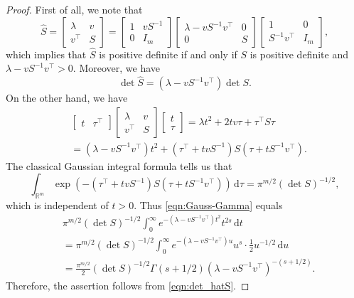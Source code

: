\documentclass[12pt]{amsart}
\theoremstyle{plain}
\theoremstyle{definition}
\theoremstyle{remark}
\newcommand{\R}{\mathbb{R}}
\newcommand{\1}{\mathbf{1}}
\newcommand{\dd}{\mathrm{d}}
\begin{document}
\begin{proof}
First of all,
we note that
\[
\hat{S}
 = \begin{bmatrix} \lambda & v \\ v^\top & S \end{bmatrix}
= \begin{bmatrix} 1 & v S^{-1} \\ 0 & I_m \end{bmatrix} 
\begin{bmatrix} \lambda - v S^{-1} v^\top & 0 \\ 0 & S \end{bmatrix}
\begin{bmatrix} 1 & 0\\ S^{-1} v^\top & I_m \end{bmatrix}, 
\]
which implies that $\hat{S}$ is positive definite if and only if $S$ is positive definite
 and $\lambda - v S^{-1} v^\top >0$.
Moreover, we have
\begin{equation} \label{eqn:det_hatS}
\det \hat{S} = (\lambda - v S^{-1} v^\top) \det S. 
\end{equation}
On the other hand,
 we have
\begin{align*}
{} &
 \begin{bmatrix} t & \tau^\top \end{bmatrix}
\begin{bmatrix} \lambda & v \\ v^\top & S \end{bmatrix}
\begin{bmatrix} t\\ \tau \end{bmatrix} 
= \lambda t^2 + 2 t v \tau + \tau^\top S \tau \\
&= (\lambda - v S^{-1} v^\top) t^2 + (\tau^\top + t v S^{-1}) S (\tau + t S^{-1}v^\top).
\end{align*}
The classical Gaussian integral formula tells us that
$$ \int_{\R^m}
\exp(-  (\tau^\top + t v S^{-1}) S (\tau + t S^{-1}v^\top ))
\,\dd\tau = \pi^{m/2} (\det S)^{-1/2}, $$
which is independent of $t>0$.
Thus \eqref{eqn:Gauss-Gamma} equals
\begin{align*}
{} & \pi^{m/2} (\det S)^{-1/2}
\int_0^\infty e^{- (\lambda - v S^{-1} v^\top) t^2} t^{2s}\,\dd t\\
&= \pi^{m/2} (\det S)^{-1/2} \int_0^{\infty} e^{- (\lambda - v S^{-1} v^\top)u}
u^s \cdot \frac{1}{2} u^{-1/2} \,\dd u\\
&= \frac{\pi^{m/2}}{2} (\det S)^{-1/2} 
 \Gamma(s + 1/2) (\lambda - v S^{-1} v^\top)^{-(s+1/2)}.
\end{align*}
Therefore, the assertion follows from \eqref{eqn:det_hatS}.
\end{proof}
\end{document}
